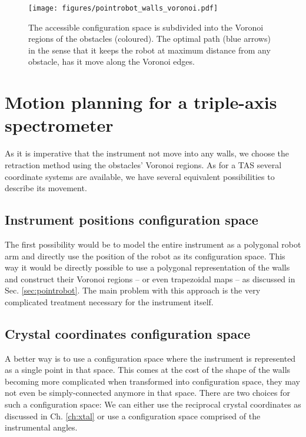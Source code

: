 \begin{figure}[htb]
	\centering
	\texttt{[image: figures/pointrobot\_walls\_voronoi.pdf]}
	\caption{The accessible configuration space is subdivided into the Voronoi regions of the obstacles (coloured). The optimal
		path (blue arrows) in the sense that it keeps the robot at maximum distance from any obstacle, has it move along the 
		Voronoi edges.}
	\label{fig:robot_voronoi}
\end{figure}



\section{Motion planning for a triple-axis spectrometer}
\label{sec:tasrobot}

As it is imperative that the instrument not move into any walls, we choose the retraction method using the obstacles' Voronoi regions.
As for a TAS several coordinate systems are available, we have several equivalent possibilities to describe its movement. 

\subsection*{Instrument positions configuration space}
The first possibility would be to model the entire instrument as a polygonal robot arm and directly use the position of the robot as
its configuration space. This way it would be directly possible to use a polygonal representation of the walls and construct their
Voronoi regions -- or even trapezoidal maps -- as discussed in Sec. \ref{sec:pointrobot}. The main problem with this approach is the
very complicated treatment necessary for the instrument itself.

\subsection*{Crystal coordinates configuration space}
A better way is to use a configuration space where the instrument is represented as a single point in that space. This comes at the 
cost of the shape of the walls becoming more complicated when transformed into configuration space, 
they may not even be simply-connected anymore in that space. There
are two choices for such a configuration space: We can either use the reciprocal crystal coordinates as discussed in Ch. \ref{ch:xtal}
or use a configuration space comprised of the instrumental angles.

